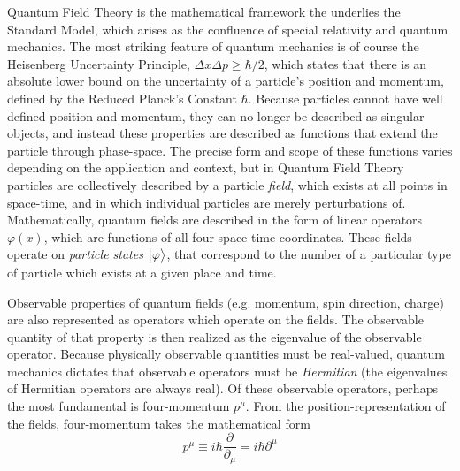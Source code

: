     Quantum Field Theory is the mathematical framework the underlies the Standard Model,
        which arises as the confluence of special relativity and quantum mechanics.
    The most striking feature of quantum mechanics is of course the Heisenberg Uncertainty Principle,
        $\Delta x \Delta p \geq \hbar/2$, which states that there is an absolute lower bound on the
        uncertainty of a particle's position and momentum, defined by the Reduced Planck's Constant $\hbar$.
    Because particles cannot have well defined position and momentum, they can no longer be described as singular objects,
        and instead these properties are described as functions that extend the particle through phase-space.
    The precise form and scope of these functions varies depending on the application and context,
        but in Quantum Field Theory particles are collectively described by a particle \textit{field},
        which exists at all points in space-time, and in which individual particles are merely perturbations of.
    Mathematically, quantum fields are described in the form of linear operators $\varphi(x)$,
        which are functions of all four space-time coordinates.
    These fields operate on \textit{particle states} $\big| \varphi \big>$,
        that correspond to the number of a particular type of particle which exists at a given place and time.

    Observable properties of quantum fields (e.g. momentum, spin direction, charge)
        are also represented as operators which operate on the fields.
    The observable quantity of that property is then realized as the eigenvalue of the observable operator.
    Because physically observable quantities must be real-valued,
        quantum mechanics dictates that observable operators must be \textit{Hermitian}
        (the eigenvalues of Hermitian operators are always real)\cite{Griffiths_book}.
    Of these observable operators, perhaps the most fundamental is four-momentum $p^\mu$.
    From the position-representation of the fields,
        four-momentum takes the mathematical form
    \begin{equation}
        p^\mu \equiv i \hbar \frac{\partial}{\partial_\mu} = i \hbar \partial^\mu
    \end{equation}


